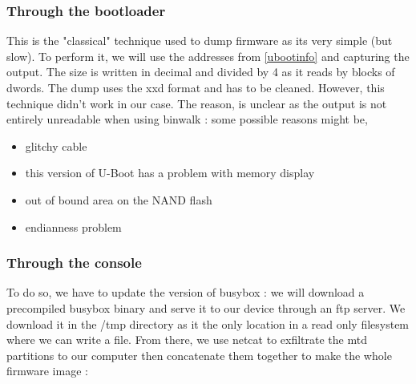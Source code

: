 \documentclass{article}
\begin{document}
\subsubsection{Through the bootloader}\label{Dumpuboot}
This is the "classical" technique used to dump firmware as its very simple (but slow). To perform it, we will use the addresses from \ref{ubootinfo} and capturing the output. The size is written in decimal and divided by 4 as it reads by blocks of dwords. The dump uses the xxd format and has to be cleaned. However, this technique didn't work in our case. The reason, is unclear as the output is not entirely unreadable when using binwalk : some possible reasons might be,
\begin{itemize}
	\item glitchy cable
	\item this version of U-Boot has a problem with memory display
	\item out of bound area on the NAND flash
	\item endianness problem	
\end{itemize}
\subsubsection{Through the console}
To do so, we have to update the version of busybox : we will download a precompiled busybox binary and serve it to our device through an ftp server. We download it in the /tmp directory as it the only location in a read only filesystem where we can write a file. From there, we use netcat to exfiltrate the mtd partitions to our computer then concatenate them together to make the whole firmware image :
\end{document}
